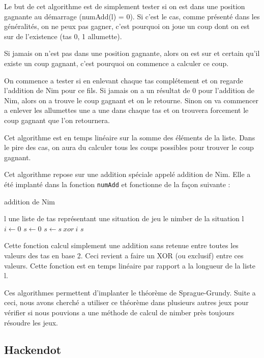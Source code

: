 Le but de cet algorithme est de simplement tester si on est dans une position gagnante au démarrage (numAdd(l) = 0). Si c'est le cas, comme présenté dans les généralités, on ne peux pas gagner, c'est pourquoi on joue un coup dont on est sur de l'existence (tas 0, 1 allumette).

Si jamais on n'est pas dans une position gagnante, alors on est sur et certain qu'il existe un coup gagnant, c'est pourquoi on commence a calculer ce coup.

On commence a tester si en enlevant chaque tas complétement et on regarde l'addition de Nim pour ce fils. Si jamais on a un résultat de 0 pour l'addition de Nim, alors on a trouve le coup gagnant et on le retourne. Sinon on va commencer a enlever les allumettes une a une dans chaque tas et on trouvera forcement le coup gagnant que l'on retournera.

Cet algorithme est en temps linéaire sur la somme des éléments de la liste. Dans le pire des cas, on aura du calculer tous les coups possibles pour trouver le coup gagnant.

Cet algorithme repose sur une addition spéciale appelé addition de Nim. Elle a été implanté dans la fonction \texttt{numAdd} et fonctionne de la façon suivante :

\begin{algorithm}[h]
  \caption{addition de Nim}
  \begin{algorithmic}[h]
    \REQUIRE l une liste de tas représentant une situation de jeu
    \ENSURE le nimber de la situation l
    \STATE $i \leftarrow 0$
    \STATE $s \leftarrow 0$
      \STATE $s \leftarrow s\ xor\ i$
    \ENDFOR
    \RETURN $s$
  \end{algorithmic}
\end{algorithm}

Cette fonction calcul simplement une addition sans retenue entre toutes les valeurs des tas en base 2. Ceci revient a faire un XOR (ou exclusif) entre ces valeurs. Cette fonction est en temps linéaire par rapport a la longueur de la liste l.

Ces algorithmes permettent d'implanter le théorème de Sprague-Grundy. Suite a ceci, nous avons cherché a utiliser ce théorème dans plusieurs autres jeux pour vérifier si nous pouvions a une méthode de calcul de nimber près toujours résoudre les jeux.

\subsection{Hackendot}
\label{sub:Hackendot}

